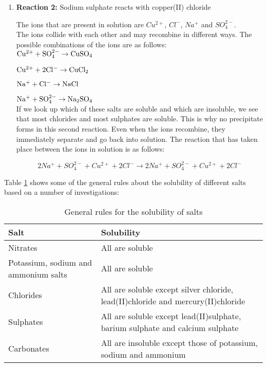 \begin{enumerate}
{}

\item{\textbf{Reaction 2:} Sodium sulphate reacts with copper(II) chloride

The ions that are present in solution are $Cu^{2+}$, $Cl^{-}$, $Na^{+}$ and $SO_{4}^{2-}$.\\

The ions collide with each other and may recombine in different ways. The possible combinations of the ions are as follows:\\

$\rm{Cu^{2+} + SO_{4}^{2-} \rightarrow CuSO_{4}}$

$\rm{Cu^{2+} + 2Cl^{-} \rightarrow CuCl_{2}}$

$\rm{Na^{+} + Cl^{-} \rightarrow NaCl}$

$\rm{Na^{+} + SO_{4}^{2-} \rightarrow Na_{2}SO_{4}}$\\

If we look up which of these salts are soluble and which are insoluble, we see that most chlorides and most sulphates are soluble. This is why no precipitate forms in this second reaction. Even when the ions recombine, they immediately separate and go back into solution. The reaction that has taken place between the ions in solution is as follows:

\begin{equation*}
2Na^{+} + SO_{4}^{2-} + Cu^{2+} + 2Cl^{-} \rightarrow 2Na^{+} + SO_{4}^{2-} + Cu^{2+} + 2Cl^{-} 
\end{equation*}
}
\end{enumerate}

Table \ref{tab:solubility rules} shows some of the general rules about the solubility of different salts based on a number of investigations:


\begin{table}[h]
\caption{General rules for the solubility of salts}
\label{tab:solubility rules}
\begin{center}
\begin{tabular}{|p{5cm}|p{5cm}|}\hline
\textbf{Salt} & \textbf{Solubility} \\\hline
Nitrates & All are soluble \\\hline
Potassium, sodium and ammonium salts & All are soluble \\\hline
Chlorides & All are soluble except silver chloride, lead(II)chloride and mercury(II)chloride \\\hline
Sulphates & All are soluble except lead(II)sulphate, barium sulphate and calcium sulphate \\\hline
Carbonates & All are insoluble except those of potassium, sodium and ammonium \\\hline
\end{tabular}
\end{center}
\end{table}


